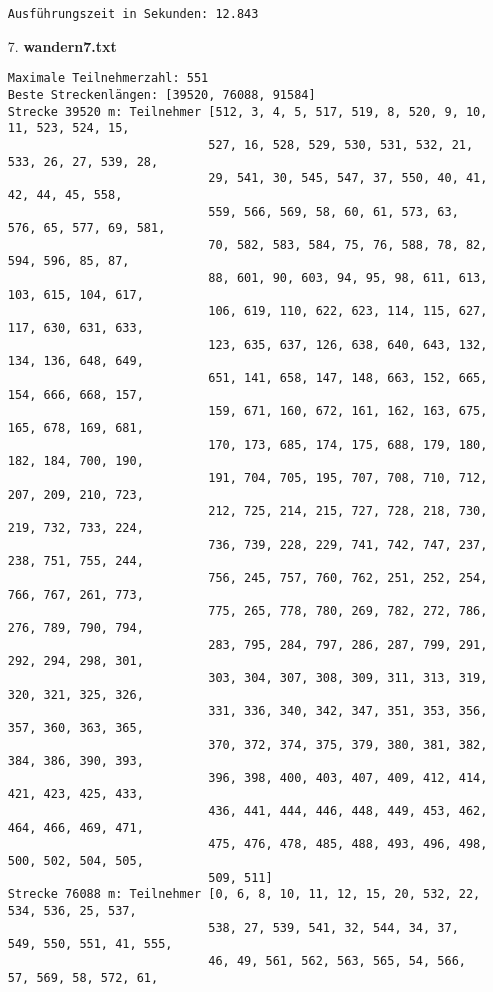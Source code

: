 \documentclass[a4paper,10pt,ngerman]{scrartcl}
\begin{document}
\begin{itemize}
\begin{verbatim}
Ausführungszeit in Sekunden: 12.843
  \end{verbatim}
  \item [7.] \textbf{wandern7.txt}
  \begin{verbatim}
Maximale Teilnehmerzahl: 551
Beste Streckenlängen: [39520, 76088, 91584]
Strecke 39520 m: Teilnehmer [512, 3, 4, 5, 517, 519, 8, 520, 9, 10, 11, 523, 524, 15, 
                            527, 16, 528, 529, 530, 531, 532, 21, 533, 26, 27, 539, 28, 
                            29, 541, 30, 545, 547, 37, 550, 40, 41, 42, 44, 45, 558, 
                            559, 566, 569, 58, 60, 61, 573, 63, 576, 65, 577, 69, 581, 
                            70, 582, 583, 584, 75, 76, 588, 78, 82, 594, 596, 85, 87, 
                            88, 601, 90, 603, 94, 95, 98, 611, 613, 103, 615, 104, 617, 
                            106, 619, 110, 622, 623, 114, 115, 627, 117, 630, 631, 633, 
                            123, 635, 637, 126, 638, 640, 643, 132, 134, 136, 648, 649, 
                            651, 141, 658, 147, 148, 663, 152, 665, 154, 666, 668, 157, 
                            159, 671, 160, 672, 161, 162, 163, 675, 165, 678, 169, 681, 
                            170, 173, 685, 174, 175, 688, 179, 180, 182, 184, 700, 190, 
                            191, 704, 705, 195, 707, 708, 710, 712, 207, 209, 210, 723, 
                            212, 725, 214, 215, 727, 728, 218, 730, 219, 732, 733, 224, 
                            736, 739, 228, 229, 741, 742, 747, 237, 238, 751, 755, 244, 
                            756, 245, 757, 760, 762, 251, 252, 254, 766, 767, 261, 773, 
                            775, 265, 778, 780, 269, 782, 272, 786, 276, 789, 790, 794, 
                            283, 795, 284, 797, 286, 287, 799, 291, 292, 294, 298, 301, 
                            303, 304, 307, 308, 309, 311, 313, 319, 320, 321, 325, 326, 
                            331, 336, 340, 342, 347, 351, 353, 356, 357, 360, 363, 365, 
                            370, 372, 374, 375, 379, 380, 381, 382, 384, 386, 390, 393, 
                            396, 398, 400, 403, 407, 409, 412, 414, 421, 423, 425, 433, 
                            436, 441, 444, 446, 448, 449, 453, 462, 464, 466, 469, 471, 
                            475, 476, 478, 485, 488, 493, 496, 498, 500, 502, 504, 505, 
                            509, 511]
Strecke 76088 m: Teilnehmer [0, 6, 8, 10, 11, 12, 15, 20, 532, 22, 534, 536, 25, 537, 
                            538, 27, 539, 541, 32, 544, 34, 37, 549, 550, 551, 41, 555, 
                            46, 49, 561, 562, 563, 565, 54, 566, 57, 569, 58, 572, 61, 

\end{verbatim}
\end{itemize}
\end{document}
